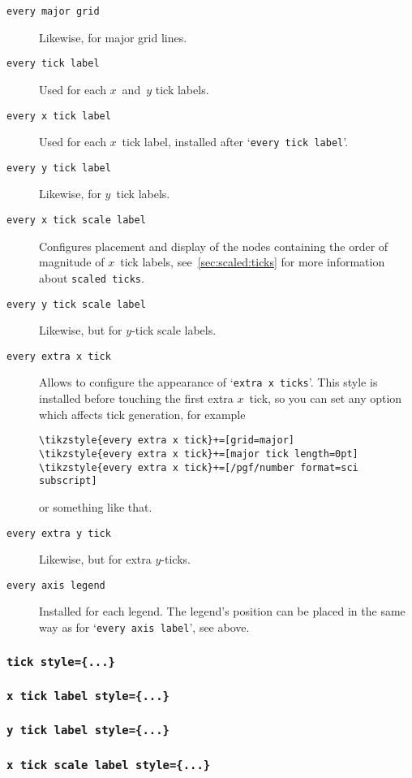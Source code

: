 \begin{description}
\item[\texttt{every major grid}] Likewise, for major grid lines.
\item[\texttt{every tick label}] Used for each $x$~and~$y$ tick labels.
\item[\texttt{every x tick label}] Used for each $x$~tick label, installed after `\texttt{every tick label}'.
\item[\texttt{every y tick label}] Likewise, for $y$~tick labels.
\item[\texttt{every x tick scale label}] Configures placement and display of the nodes containing the order of magnitude of $x$~tick labels, see~\ref{sec:scaled:ticks} for more information about \texttt{scaled ticks}.
\item[\texttt{every y tick scale label}] Likewise, but for $y$-tick scale labels.
\item[\texttt{every extra x tick}] Allows to configure the appearance of `\texttt{extra x ticks}'. This style is installed before touching the first extra $x$~tick, so you can set any option which affects tick generation, for example
\begin{lstlisting}
\tikzstyle{every extra x tick}+=[grid=major]
\tikzstyle{every extra x tick}+=[major tick length=0pt]
\tikzstyle{every extra x tick}+=[/pgf/number format=sci subscript]
\end{lstlisting}
or something like that.
\item[\texttt{every extra y tick}] Likewise, but for extra $y$-ticks.
\item[\texttt{every axis legend}] Installed for each legend. The legend's position can be placed in the same way as for `\texttt{every axis label}', see above.
\end{description}

\subsubsection{\texttt{tick style=\{...\}}}
\subsubsection{\texttt{x tick label style=\{...\}}}
\subsubsection{\texttt{y tick label style=\{...\}}}
\subsubsection{\texttt{x tick scale label style=\{...\}}}
